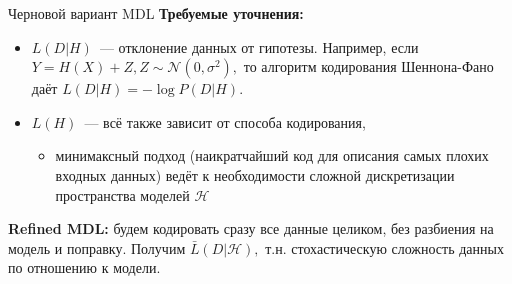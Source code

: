 \documentclass[unicode,lefteqn,c,hyperref={pdfpagelabels=true}]{beamer}
\begin{document}
\begin{frame}{Черновой вариант MDL}
	\textbf{Требуемые уточнения:}
	\begin{itemize}
		\item $L(D|H)$~--- отклонение данных от гипотезы. Например, если $Y=H(X) + Z, Z \sim \mathcal N(0,\sigma^2),$ то алгоритм кодирования Шеннона-Фано даёт $L(D|H)=-\log P(D|H).$ 
		\item $L(H)$~--- всё также зависит от способа кодирования,
		\begin{itemize}
			\item минимаксный подход (наикратчайший код для описания самых плохих входных данных) ведёт к необходимости сложной дискретизации пространства моделей $\mathcal{H}$
		\end{itemize}
	\end{itemize}

	\textbf{Refined MDL:} будем кодировать сразу все данные целиком, без разбиения на модель и поправку. Получим $\bar L(D|\mathcal H),$ т.н. стохастическую сложность данных по отношению к модели.
	
\end{frame}
\end{document}
